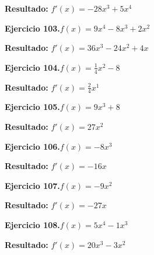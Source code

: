 \documentclass[10pt,a4paper]{article}
\begin{document}
\begin{solbox}
\textbf{Resultado:} \(\displaystyle f'(x) = -28x^{3} + 5x^{4}\)
\end{solbox}

\newpage
\begin{ejbox}
\textbf{Ejercicio 103.}\quad $f(x) = 9x^4 -8x^3 +2x^2$
\end{ejbox}

\begin{solbox}
\textbf{Resultado:} \(\displaystyle f'(x) = 36x^3 -24x^2 +4x\)
\end{solbox}

\begin{ejbox}
\textbf{Ejercicio 104.}\quad $f(x) = \frac{1}{4}x^{2} -8$
\end{ejbox}

\begin{solbox}
\textbf{Resultado:} \(\displaystyle f'(x) = \frac{2}{4}x^{1}\)
\end{solbox}

\begin{ejbox}
\textbf{Ejercicio 105.}\quad $f(x) = 9x^{3} +8$
\end{ejbox}

\begin{solbox}
\textbf{Resultado:} \(\displaystyle f'(x) = 27x^{2}\)
\end{solbox}

\newpage
\begin{ejbox}
\textbf{Ejercicio 106.}\quad $f(x) = -8x^{3}$
\end{ejbox}

\begin{solbox}
\textbf{Resultado:} \(\displaystyle f'(x) = -16x\)
\end{solbox}

\begin{ejbox}
\textbf{Ejercicio 107.}\quad $f(x) = -9x^{2}$
\end{ejbox}

\begin{solbox}
\textbf{Resultado:} \(\displaystyle f'(x) = -27x\)
\end{solbox}

\begin{ejbox}
\textbf{Ejercicio 108.}\quad $f(x) = 5x^{4} -1x^{3}$
\end{ejbox}

\begin{solbox}
\textbf{Resultado:} \(\displaystyle f'(x) = 20x^{3} -3x^{2}\)
\end{solbox}
\end{document}
